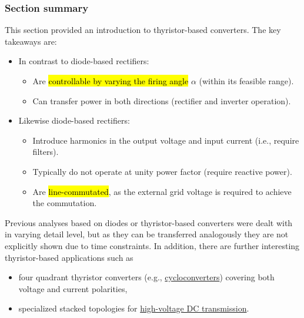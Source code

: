 \begin{frame}
    \frametitle{Section summary}
    This section provided an introduction to thyristor-based converters. The key takeaways are:
    \begin{itemize}
        \item In contrast to diode-based rectifiers:
        \begin{itemize}
            \item Are \hl{controllable by varying the firing angle} $\alpha$ (within its feasible range).
            \item Can transfer power in both directions (rectifier and inverter operation).
        \end{itemize}
        \item Likewise diode-based rectifiers:
        \begin{itemize}
            \item Introduce harmonics in the output voltage and input current (i.e., require filters).
            \item Typically do not operate at unity power factor (require reactive power).
            \item Are \hl{line-commutated}, as the external grid voltage is required to achieve the commutation.
        \end{itemize}
    \end{itemize}
   Previous analyses based on diodes or thyristor-based converters were dealt with in varying detail level, but as they can be transferred analogously they are not explicitly shown due to time constraints. In addition, there are further interesting thyristor-based applications such as
    \begin{itemize}
        \item four quadrant thyristor converters (e.g., \href{https://en.wikipedia.org/wiki/Cycloconverter}{cycloconverters}) covering both voltage and current polarities,
        \item specialized stacked topologies for \href{https://en.wikipedia.org/wiki/High-voltage_direct_current}{high-voltage DC transmission}.
    \end{itemize}
\end{frame}